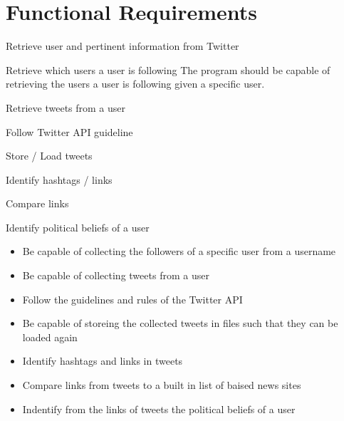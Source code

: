 \section{Functional Requirements}

\begin{requirement}{Retrieve user and pertinent information from Twitter}

\end{requirement}

\begin{requirement}{Retrieve which users a user is following}
The program should be capable of retrieving the users a user is
following given a specific user.
\end{requirement}

\begin{requirement}{Retrieve tweets from a user}

\end{requirement}

\begin{requirement}{Follow Twitter API guideline}

\end{requirement}

\begin{requirement}{Store / Load tweets}

\end{requirement}

\begin{requirement}{Identify hashtags / links}

\end{requirement}

\begin{requirement}{Compare links}

\end{requirement}

\begin{requirement}{Identify political beliefs of a user }

\end{requirement}
\begin{itemize}
 \item Be capable of collecting the followers of a specific user from a username
 \item Be capable of collecting tweets from a user
 \item Follow the guidelines and rules of the Twitter API
 \item Be capable of storeing the collected tweets in files such that they can
 be loaded again
 \item Identify hashtags and links in tweets
 \item Compare links from tweets to a built in list of baised news sites
 \item Indentify from the links of tweets the political beliefs of a user
\end{itemize}


